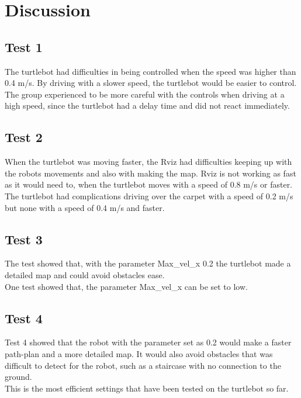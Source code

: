 \chapter{Discussion}

\section{Test 1}
The turtlebot had difficulties in being controlled when the speed was higher than 0.4 m/s. By driving with a slower speed, the turtlebot would be easier to control.
The group experienced to be more careful with the controls when driving at a high speed, since the turtlebot had a delay time and did not react immediately.

\section{Test 2}
When the turtlebot was moving faster, the Rviz had difficulties keeping up with the robots movements and also with making the map. Rviz is not working as fast as it would need to, when the turtlebot moves with a speed of 0.8 m/s or faster. The turtlebot had complications driving over the carpet with a speed of 0.2 m/s but none with a speed of 0.4 m/s and faster.

\section{Test 3}
The test showed that, with the parameter Max\_vel\_x 0.2 the turtlebot made a detailed map and could avoid obstacles ease.\\
One test showed that, the parameter Max\_vel\_x can be set to low.

\section{Test 4}
Test 4 showed that the robot with the parameter set as 0.2 would make a faster path-plan and a more detailed map. It would also avoid obstacles that was difficult to detect for the robot, such as a staircase with no connection to the ground.\\
This is the most efficient settings that have been tested on the turtlebot so far.